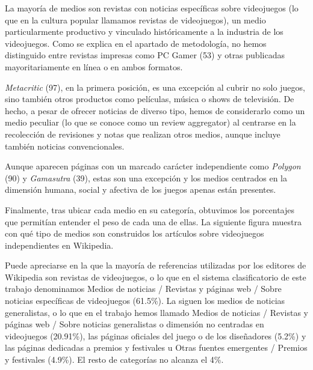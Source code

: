 \documentclass[spanish]{textolivre}
\begin{document}
La mayoría de medios son revistas con noticias específicas sobre videojuegos (lo que en la cultura popular llamamos revistas de videojuegos), un medio particularmente productivo y vinculado históricamente a la industria de los videojuegos. Como se explica en el apartado de metodología, no hemos distinguido entre revistas impresas como PC Gamer (53) y otras publicadas mayoritariamente en línea o en ambos formatos.

\emph{Metacritic} (97), en la primera posición, es una excepción al cubrir no solo juegos, sino también otros productos como películas, música o shows de televisión. De hecho, a pesar de ofrecer noticias de diverso tipo, hemos de considerarlo como un medio peculiar (lo que se conoce como un review aggregator) al centrarse en la recolección de revisiones y notas que realizan otros medios, aunque incluye también noticias convencionales.

Aunque aparecen páginas con un marcado carácter independiente como \emph{Polygon} (90) y \emph{Gamasutra} (39), estas son una excepción y los medios centrados en la dimensión humana, social y afectiva de los juegos apenas están presentes.

Finalmente, tras ubicar cada medio en su categoría, obtuvimos los porcentajes que permitían entender el peso de cada una de ellas. La siguiente figura muestra con qué tipo de medios son construidos los artículos sobre videojuegos independientes en Wikipedia.

Puede apreciarse en la  que la mayoría de referencias utilizadas por los editores de Wikipedia son revistas de videojuegos, o lo que en el sistema clasificatorio de este trabajo denominamos Medios de noticias / Revistas y páginas web / Sobre noticias específicas de videojuegos (61.5\%). La siguen los medios de noticias generalistas, o lo que en el trabajo hemos llamado Medios de noticias / Revistas y páginas web / Sobre noticias generalistas o dimensión no centradas en videojuegos (20.91\%), las páginas oficiales del juego o de los diseñadores (5.2\%) y las páginas dedicadas a premios y festivales u Otras fuentes emergentes / Premios y festivales (4.9\%). El resto de categorías no alcanza el 4\%.
\end{document}
